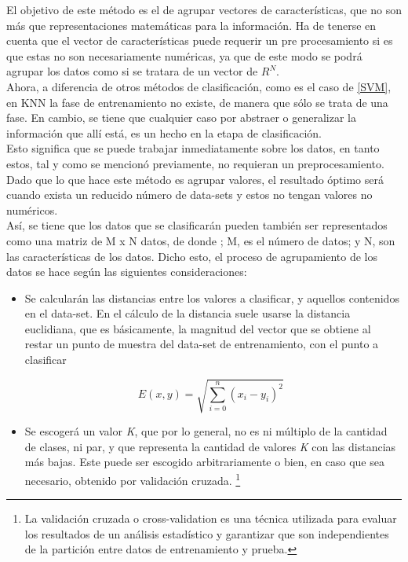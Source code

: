 \begin{itemize}
{\begin{enumerate}
\begin{enumerate}
{                El objetivo de este método es el de agrupar vectores de características, que no son más que representaciones matemáticas para la información. Ha de tenerse en cuenta que el vector de características puede requerir un pre procesamiento si es que estas no son necesariamente numéricas, ya que de este modo se podrá agrupar los datos como si se tratara de un vector de $R^{N}$.\\

                Ahora, a diferencia de otros métodos de clasificación, como es el caso de \ref{SVM}, en KNN la fase de entrenamiento no existe, de manera que sólo se trata de una fase. En cambio, se tiene que cualquier caso por abstraer o generalizar la información que allí está, es un hecho en la etapa de clasificación.\\

                Esto significa que se puede trabajar inmediatamente sobre los datos, en tanto estos, tal y como se mencionó previamente, no requieran un preprocesamiento. Dado que lo que hace este método es agrupar valores, el resultado óptimo será cuando exista un reducido número de  data-sets y estos no tengan valores no numéricos.\\

                Así, se tiene que los datos que se clasificarán pueden también ser representados como una matriz de M x N  datos, de donde ; M, es el número de datos; y N, son las características de los datos. Dicho esto, el proceso de agrupamiento de los datos se hace según las siguientes consideraciones:\\

                \begin{itemize}
                    \item {Se calcularán las distancias entre los valores a clasificar, y aquellos contenidos en el data-set. En el cálculo de la distancia suele usarse la distancia euclidiana, que es básicamente, la magnitud del vector que se obtiene al restar un punto de muestra del data-set de entrenamiento, con el punto a clasificar
    
                    \begin{equation}
                        E(x,y) = \sqrt{\sum_{i=0}^{n}({x_{i}-y_{i}})^{2}} \ \ 
                    \end{equation}
                    }

                    \item{Se escogerá un valor \textit{K}, que por lo general, no es ni múltiplo de la cantidad de clases, ni par, y que representa la cantidad de valores \textit{K} con las distancias más bajas. Este puede ser escogido arbitrariamente o bien, en caso que sea necesario, obtenido por validación cruzada. \footnote{La validación cruzada o cross-validation es una técnica utilizada para evaluar los resultados de un análisis estadístico y garantizar que son independientes de la partición entre datos de entrenamiento y prueba.}\\}
                    

\end{itemize}}
\end{enumerate}
\end{enumerate}}
\end{itemize}
